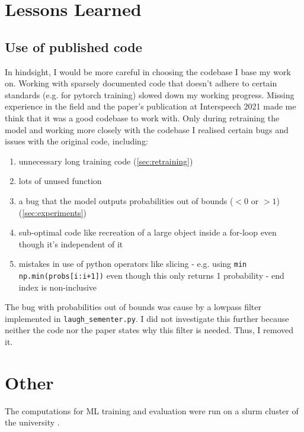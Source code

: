 \documentclass[bsc,frontabs,parskip,deptreport]{infthesis}
\begin{document}
\chapter{Lessons Learned}

\section{Use of published code}
In hindsight, I would be more careful in choosing the codebase I base my work on.
Working with sparsely documented code that doesn't adhere to certain standards (e.g. for pytorch training) slowed down my working progress. 
Missing experience in the field and the paper's publication at Interspeech 2021 made me think that it was a good codebase to work with.
Only during retraining the model and working more closely with the codebase I realised certain bugs and issues with the original code, including:
\begin{enumerate}
    \item unnecessary long training code (\autoref{sec:retraining})
    \item lots of unused function
    \item a bug that the model outputs probabilities out of bounds ($<0$ or $>1$) (\autoref{sec:experiments})
    \item sub-optimal code like recreation of a large object inside a for-loop even though it's independent of it
    \item mistakes in use of python operators like slicing - e.g. using \texttt{min} \texttt{np.min(probs[i:i+1])} even though this only returns 1 probability - end index is non-inclusive
\end{enumerate}

The bug with probabilities out of bounds was cause by a lowpass filter implemented in \verb|laugh_sementer.py|. I did not investigate this further because neither the code nor the paper states why this filter is needed. Thus, I removed it.

\chapter{Other}

The computations for ML training and evaluation were run on a slurm cluster of the university \citep{yoo2003slurm, tange2011gnu}.





\appendix
\end{document}
